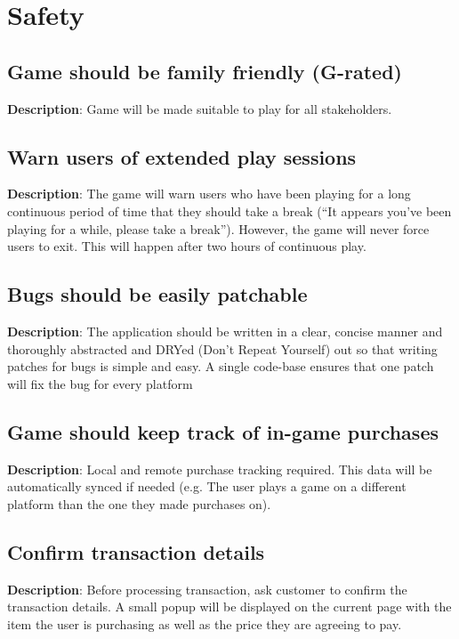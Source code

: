 \section{Safety}
\renewcommand\thesubsection{SAF-%
\ifnum\value{subsection}<10 0\fi
\arabic{subsection}}
\subsection{Game should be family friendly (G-rated)}
\textbf{Description}: Game will be made suitable to play for all stakeholders.

\subsection{Warn users of extended play sessions}
\textbf{Description}: The game will warn users who have been playing for a
long continuous period of time that they should take a break (\textquotedblleft{}It
appears you\textquoteright{}ve been playing for a while, please take
a break\textquotedblright{}). However, the game will never force users
to exit. This will happen after two hours of continuous play.

\subsection{Bugs should be easily patchable}
\textbf{Description}: The application should be written in a clear, concise
manner and thoroughly abstracted and DRYed (Don\textquoteright{}t
Repeat Yourself) out so that writing patches for bugs is simple and
easy. A single code-base ensures that one patch will fix the bug for
every platform

\subsection{Game should keep track of in-game purchases}
\textbf{Description}: Local and remote purchase tracking required. This data
will be automatically synced if needed (e.g. The user plays a game
on a different platform than the one they made purchases on). 

\subsection{Confirm transaction details}
\textbf{Description}: Before processing transaction, ask customer to confirm
the transaction details. A small popup will be displayed on the current
page with the item the user is purchasing as well as the price they
are agreeing to pay.

